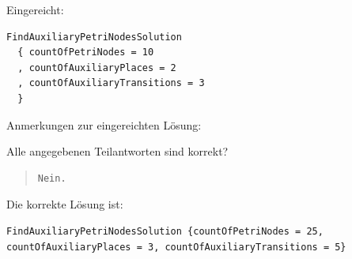Eingereicht:


\begin{verbatim}
FindAuxiliaryPetriNodesSolution 
  { countOfPetriNodes = 10
  , countOfAuxiliaryPlaces = 2
  , countOfAuxiliaryTransitions = 3 
  }
\end{verbatim}


Anmerkungen zur eingereichten Lösung:

Alle angegebenen Teilantworten sind korrekt?

\begin{quote}
\begin{verbatim}
Nein.
\end{verbatim}
\end{quote}

Die korrekte Lösung ist:
\begin{verbatim}
FindAuxiliaryPetriNodesSolution {countOfPetriNodes = 25, countOfAuxiliaryPlaces = 3, countOfAuxiliaryTransitions = 5}
\end{verbatim}


